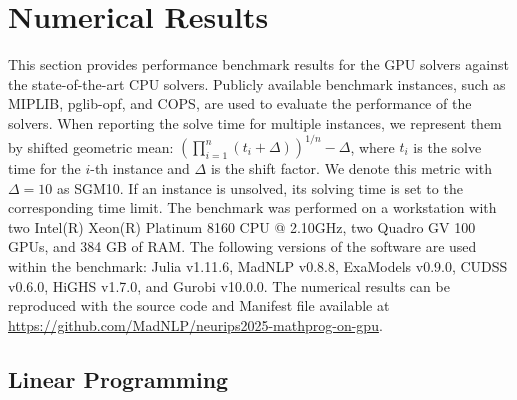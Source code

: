 \documentclass{article}
\begin{document}
\section{Numerical Results}\label{eqn:num}
This section provides performance benchmark results for the GPU solvers against the state-of-the-art CPU solvers.
Publicly available benchmark instances, such as MIPLIB, pglib-opf, and COPS, are used to evaluate the performance of the solvers.
When reporting the solve time for multiple instances, we represent them by shifted geometric mean: $\left(\prod_{i=1}^n (t_i + \Delta)\right)^{1/n} - \Delta$, where $t_i$ is the solve time for the $i$-th instance and $\Delta$ is the shift factor. We denote this metric with $\Delta = 10$ as SGM10. If an instance is unsolved, its solving time is set to the corresponding time limit.
The benchmark was performed on a workstation with two Intel(R) Xeon(R) Platinum 8160 CPU @ 2.10GHz, two Quadro GV 100 GPUs, and 384 GB of RAM.
The following versions of the software are used within the benchmark: Julia v1.11.6, MadNLP v0.8.8, ExaModels v0.9.0, CUDSS v0.6.0, HiGHS v1.7.0, and Gurobi v10.0.0.
The numerical results can be reproduced with the source code and Manifest file available at \url{https://github.com/MadNLP/neurips2025-mathprog-on-gpu}.



\subsection{Linear Programming}
\end{document}
